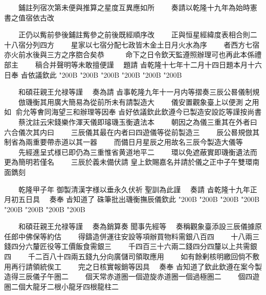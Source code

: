 \begin{正文}
　　鋪註列宿次第未便與推算之星度互異應如所
　　奏請以乾隆十九年為始時憲書之值宿依古改
\par
　　正仍以觜前參後鋪註觜參之前後既經順序改
　　正與恒星經緯度表相合則二十八宿分列四方
　　星家以七宿分配七政皆木金土日月火水為序
　　者西方七宿亦火前水後與三方之序脗合矣恭
　　𠉀
命下之日令欽天監遵照辦理可也再此本係禮部主
　　稿合并聲明等未敢擅便謹
　題請
㫖乾隆十七年十二月十四日題本月十六日奉
㫖依議欽此
\char"200B\relax{}
\char"200B\relax{}
\char"200B\relax{}
\char"200B\relax{}
\char"200B\relax{}
\char"200B\relax
\par
　　和碩荘親王允禄等謹
　奏為請
㫖事乾隆九年十一月内等摺奏三辰公晷儀制規
　　倣璣衡其用廣大簡易為從前所未有請製造大
　　儀安置觀象臺上以便測𠉀之用如𫎇
俞允等㑹同海望三和辦理等因奉
㫖好依議欽此欽遵今已製造安設訖等謹按尚書
　　蔡沈註云宋錢樂作渾天儀即璿璣玉衡遺法本
　　朝因之為儀三重其在外者曰六合儀次其内曰
　　三辰儀其最在内者曰四遊儀等從前製造三
　　辰公晷規倣其制省為兩重要帶赤道以其一器
　　而備日月星辰之用故名三辰今製造大儀等
　　先經進呈式様已即仍為三重惟省黄道地平二
　　環以免遮蔽實即璣衡遺法而更為簡明若僅名
　　三辰於義未備伏請
皇上欽賜嘉名并請於儀之正中子午雙環南面鐫刻
\par
　　乾隆甲子年
御製清漢字様以垂永久伏祈
聖訓為此謹
　奏請
㫖乾隆十九年正月初五日具
　奏奉
㫖知道了
硃筆批出璣衡撫辰儀欽此
\char"200B\relax{}
\char"200B\relax{}
\char"200B\relax{}
\char"200B\relax{}
\char"200B\relax{}
\char"200B\relax{}
\char"200B\relax{}
\char"200B\relax
\par
　　和碩荘親王允禄等謹
　奏為銷算奏
聞事先經等
　奏稱觀象臺添設三辰儀據原任郎中佛保等約估
　　得鑄造併運往安設等項辦買物料需銀八百四
　　十八兩三錢四分六釐匠役等工價飯食需銀三
　　千四百三十六兩二錢四分四釐以上共需銀四
　　千二百八十四兩五錢九分向廣儲司領取應用
　　如有餘剰核明繳回倘不敷用再行請領統俟工
　　完之日核實報銷等因具
　奏奉
㫖知道了欽此欽遵在案今製造得三辰儀子午圏二
　　個天常赤道圏一個遊旋赤道圈一個過極圏二
　　個四遊圏二個大龍牙二根小龍牙四根龍柱二

\end{正文}
